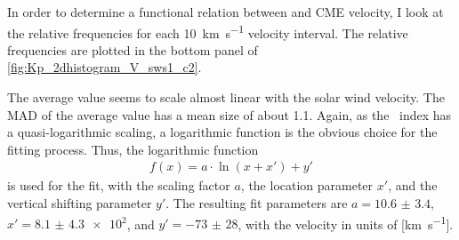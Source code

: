 In order to determine a functional relation between \Kp{} and CME velocity, I look at the relative \Kp{} frequencies for each \SI{10}{\km\per\s} velocity interval. The relative frequencies are plotted in the bottom panel of \autoref{fig:Kp_2dhistogram_V_sws1_c2}.
\begin{figure}
\end{figure}
The average \Kp{} value seems to scale almost linear with the solar wind velocity. The MAD of the average \Kp{} value has a mean \Kp{} size of about \num{1.1}.
Again, as the \Kp~index has a quasi-logarithmic scaling, a logarithmic function is the obvious choice for the fitting process. Thus, the logarithmic function
\begin{align}
	f(x) = a \cdot \ln\left(x + x'\right) + y'	\label{eq:log_offset_fit_function}
\end{align}
is used for the fit, with the scaling factor $a$, the location parameter $x'$, and the vertical shifting parameter $y'$. The resulting fit parameters are $a = \num{10.6(34)}$, $x' = \num{8.1(43)e2}$, and $y' = \num{-73(28)}$, with the velocity in units of [\si{\km\per\s}].
